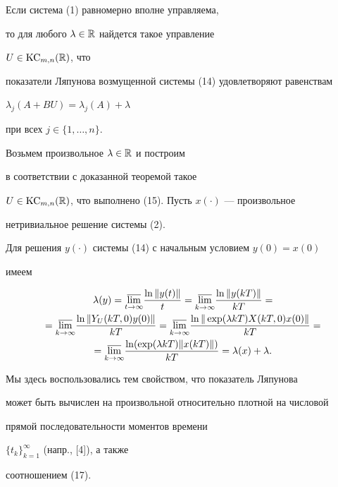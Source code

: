 \begin{cor} Если система (1) равномерно вполне управляема,


то для любого $\lambda\in\Bbb R$ найдется такое управление


$U\in\operatorname{KC}_{m,n}(\Bbb R)$, что


показатели Ляпунова возмущенной системы (14) удовлетворяют равенствам


$\lambda_{j}(A+BU)=\lambda_{j}(A)+\lambda$


при всех $j\in\{1,\dotsc,n\}$.


\end{cor}





\begin{pf} Возьмем произвольное $\lambda\in\Bbb R$ и построим


в соответствии с доказанной теоремой такое


$U\in\operatorname{KC}_{m,n}(\Bbb R)$, что выполнено (15). Пусть $x(\cdot)$ --- произвольное


нетривиальное решение системы (2).


Для решения $y(\cdot)$ системы (14) с начальным условием $y(0)=x(0)$


имеем


\begin{gather*}


\lambda(y)=\mylim{t}\frac{\ln\|y(t)\|}{t}=


\mylim{k}\frac{\ln\|y(kT)\|}{kT}=\\


=\mylim{k}\frac{\ln\|Y_{U}(kT,0)y(0)\|}{kT}=


\mylim{k}\frac{\ln\|\exp(\lambda kT)X(kT,0)x(0)\|}{kT}=\\


=\mylim{k}\frac{\ln(\exp(\lambda kT)\|x(kT)\|)}{kT}=


\lambda(x)+\lambda.


\end{gather*}


Мы здесь воспользовались тем свойством, что показатель Ляпунова


может быть вычислен на произвольной относительно плотной на числовой


прямой последовательности моментов времени


$\{t_{k}\}_{k=1}^{\infty}$ (напр., [4]), а также


соотношением (17).


\end{pf}





